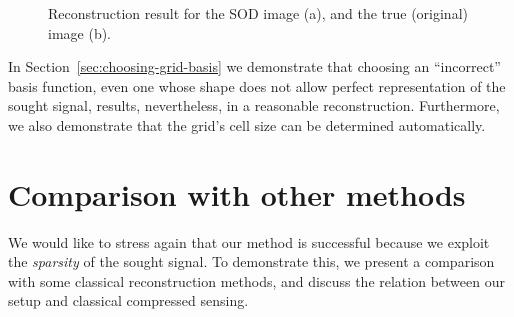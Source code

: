 \begin{figure}[H]
  \centering
  \qquad{}
  \caption[Reconstruction result for the SOD image]{Reconstruction result for the SOD image (a), and the true
    (original) image (b).}
  \label{fig:sodimg-rec-and-true}
\end{figure}
In
Section~\ref{sec:choosing-grid-basis} we demonstrate that choosing an
``incorrect'' basis function, even one whose shape does not allow 
perfect representation of 
the sought signal, results, nevertheless, in a reasonable
reconstruction. Furthermore, we also demonstrate  that the  grid's cell
size can be determined automatically.

\section{Comparison with other methods}
\label{sec:comp-with-other}
We would like to stress again that our method is successful because we
exploit the \emph{sparsity} of the sought signal. To demonstrate this,
we present a comparison with some classical reconstruction methods, and
discuss the relation between our setup and  classical compressed
sensing.

